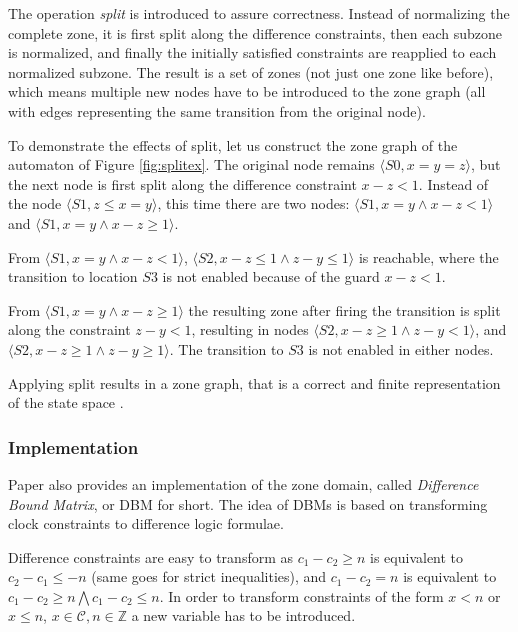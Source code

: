 The operation \emph{split} \cite{bengtsson2004timed} is introduced to assure correctness. Instead of
normalizing the complete zone, it is first split along the difference constraints,
then each subzone is normalized, and finally the initially satisfied constraints are reapplied to each normalized subzone. The result is a set of zones (not just one zone like before), which means multiple new nodes have to be introduced to the zone graph (all with edges representing the same transition from the original node).

\begin{example}
To demonstrate the effects of split, let us construct the zone graph of the automaton of Figure \ref{fig:splitex}. The original node remains  $\langle S0,x=y=z \rangle$, but the next node is first split along the difference constraint $x-z<1$. Instead of the node $\langle S1,z \leq x=y \rangle$, this time there are two nodes: $\langle S1, x=y \wedge x-z<1 \rangle$ and $\langle S1, x=y \wedge x-z \geq 1 \rangle$.

From  $\langle S1, x=y \wedge x-z<1 \rangle$,  $\langle S2,x-z \leq 1 \wedge z-y \leq 1\rangle$ is reachable, where the transition to location $S3$ is not enabled because of the guard $x-z < 1$.

From $\langle S1, x=y \wedge x-z \geq 1 \rangle$ the resulting zone after firing the transition is split along the constraint $z-y<1$, resulting in nodes $\langle S2, x-z \geq 1 \wedge z-y < 1\rangle$, and $\langle S2, x-z \geq 1 \wedge z-y \geq 1\rangle$. The transition to $S3$ is not enabled in either nodes. 
\end{example}

Applying split results in a zone graph, that is a correct and finite representation of the state space \cite{bengtsson2004timed}.

\subsubsection{Implementation}

Paper \cite{bengtsson2004timed} also provides an implementation of the zone domain, called \emph{Difference Bound Matrix}, or DBM for short. The idea of DBMs is based on transforming clock constraints to difference logic formulae.

Difference constraints are easy to transform as $c_1 - c_2 \geq n$ is equivalent to $c_2 - c_1 \leq -n$ (same goes for strict inequalities), and $c_1 - c_2 = n$ is equivalent to $c_1 - c_2 \geq n \bigwedge c_1 - c_2 \leq n$. In order to transform constraints of the form $x<n$ or$x \leq n$, $x \in \mathcal{C}, n \in \mathds{Z}$ a new variable has to be introduced.

